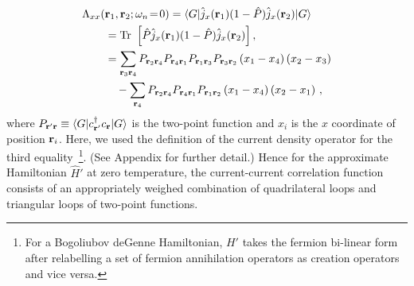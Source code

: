 \documentclass[amsmath,amssymb, aps, prx, longbibliography, twocolumn]{revtex4-1}
\begin{document}
\begin{equation}
\left. \begin{aligned}
\Lambda_{xx}(&{\bf r}_1,{\bf r}_2;\omega_n\!=\!0)
= \langle G|\hat{j}_x({\bf r}_1)(1-\hat{P}) \hat{j}_x({\bf r}_2)|G\rangle \\
   &={\rm Tr}\ \left[\hat{P}\hat{j}_x({\bf r}_1)(1-\hat{P}) \hat{j}_x({\bf r}_2)\right],\\
&= \sum_{{\bf r}_3 {\bf r}_4}P_{{\bf r}_2 {\bf r}_4}P_{{\bf r}_4{\bf r}_1}P_{{\bf r}_1{\bf r}_3}P_{{\bf r}_3{\bf r}_2}\left(x_1-x_4\right)\left(x_2-x_3\right) \\
& \quad - \sum_{{\bf r}_4}P_{{\bf r}_2 {\bf r}_4}P_{{\bf r}_4{\bf r}_1}P_{{\bf r}_1{\bf r}_2}\left(x_1-x_4\right)\left(x_2-x_1\right) \,,
\end{aligned}
\right.
\label{eq:j-j}
\end{equation}
where $P_{{\bf r}'{\bf r}}\equiv \langle G|c^\dagger_{{\bf r}'} c_{\bf r}|G\rangle $ is the two-point function and $x_i$ is the $x$ coordinate of position ${\bf r}_i$. Here, we used the definition of the current density operator for the third equality~\footnote{{\color{blue}For a Bogoliubov deGenne Hamiltonian, $H'$ takes the fermion bi-linear form after relabelling a set of fermion annihilation operators as creation operators and vice versa.}}.
(See Appendix for further detail.)
Hence for the approximate Hamiltonian $\hat{H}'$ at zero temperature, the current-current correlation function consists of an appropriately weighed combination of quadrilateral loops and triangular loops of two-point functions.
\end{document}
